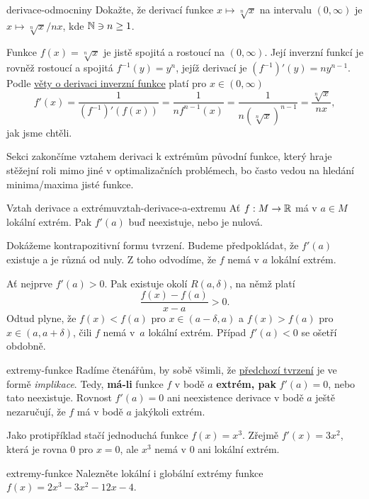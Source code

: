\begin{problem}{}{derivace-odmocniny}
 Dokažte, že derivací funkce $x \mapsto \sqrt[n]{x}$ na intervalu $(0,\infty)$
 je $x \mapsto \sqrt[n]{x} / nx$, kde $\mathbb{N} \ni n \geq 1$.
\end{problem}
\begin{probsol}
 Funkce $f(x) = \sqrt[n]{x}$ je jistě spojitá a rostoucí na $(0,\infty)$. Její
 inverzní funkcí je rovněž rostoucí a spojitá $f^{-1}(y) = y^{n}$, jejíž
 derivací je $(f^{-1})'(y) = ny^{n-1}$. Podle
 \hyperref[thm:derivace-inverzni-funkce]{věty o derivaci inverzní funkce} platí
 pro $x \in (0,\infty)$
 \[
  f'(x) = \frac{1}{(f^{-1})'(f(x))} = \frac{1}{n f^{n-1}(x)} = \frac{1}{n
  (\sqrt[n]{x})^{n-1}} = \frac{\sqrt[n]{x}}{nx},
 \]
 jak jsme chtěli.
\end{probsol}

Sekci zakončíme vztahem derivaci k extrémům původní funkce, který hraje stěžejní
roli mimo jiné v optimalizačních problémech, bo často vedou na hledání
minima/maxima jisté funkce.

\begin{proposition}{Vztah derivace a extrému}{vztah-derivace-a-extremu}
 Ať $f:M \to \mathbb{R}$ má v $a \in M$ lokální extrém. Pak $f'(a)$ buď neexistuje, nebo
 je nulová.
\end{proposition}
\begin{propproof}
 Dokážeme kontrapozitivní formu tvrzení. Budeme předpokládat, že $f'(a)$
 existuje a je různá od nuly. Z toho odvodíme, že $f$ nemá v $a$ lokální extrém.

 Ať nejprve $f'(a) > 0$. Pak existuje okolí $R(a,\delta)$, na němž platí
 \[
  \frac{f(x) - f(a)}{x - a} > 0.
 \]
 Odtud plyne, že $f(x) < f(a)$ pro $x \in (a - \delta,a)$ a $f(x) > f(a)$ pro $x
 \in (a,a+\delta)$, čili $f$ nemá v~$a$ lokální extrém. Případ $f'(a) < 0$ se
 ošetří obdobně.
\end{propproof}

\begin{warning}{}{extremy-funkce}
 Radíme čtenářům, by sobě všimli, že
 \hyperref[prop:vztah-derivace-a-extremu]{předchozí tvrzení} je ve formě
 \emph{implikace}. Tedy, \textbf{má-li} funkce $f$ v bodě $a$ \textbf{extrém,
 pak} $f'(a) = 0$, nebo tato neexistuje. Rovnost $f'(a) = 0$ ani neexistence
 derivace v bodě $a$ ještě nezaručují, že $f$ má v bodě $a$ jakýkoli extrém.

 Jako protipříklad stačí jednoduchá funkce $f(x) = x^3$. Zřejmě $f'(x) = 3x^2$,
 která je rovna $0$ pro $x = 0$, ale $x^3$ nemá v $0$ ani lokální extrém.
\end{warning}

\begin{exercise}{}{extremy-funkce}
 Nalezněte lokální i globální extrémy funkce $f(x) = 2 x^{3} - 3 x^{2} - 12 x -
 4$.
\end{exercise}
